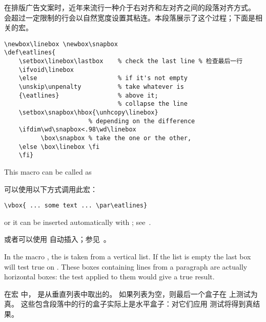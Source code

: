 在排版广告文案时，近年来流行一种介于右对齐和左对齐之间的段落对齐方式。
会超过一定限制的行会以自然宽度设置其粘连。本段落展示了这个过程；下面是相关的宏。

\begin{verbatim}
\newbox\linebox \newbox\snapbox
\def\eatlines{
    \setbox\linebox\lastbox    % check the last line % 检查最后一行
    \ifvoid\linebox
    \else                      % if it's not empty 
    \unskip\unpenalty          % take whatever is 
    {\eatlines}                % above it; 
                               % collapse the line
    \setbox\snapbox\hbox{\unhcopy\linebox} 
                       % depending on the difference
    \ifdim\wd\snapbox<.98\wd\linebox
          \box\snapbox % take the one or the other,
    \else \box\linebox \fi
    \fi}
\end{verbatim}
This macro can be called as

可以使用以下方式调用此宏：
\begin{verbatim}
\vbox{ ... some text ... \par\eatlines}
\end{verbatim}
or it can be inserted automatically
with ; see~\cite{E1}.

或者可以使用  自动插入；参见~\cite{E1}。

In the macro , the  is taken
from a vertical list. If the list is empty
the last box will test true on .
These boxes containing lines from a paragraph
are actually horizontal boxes: the test
 applied to them would give a true
result.

在宏  中， 是从垂直列表中取出的。
如果列表为空，则最后一个盒子在  上测试为真。
这些包含段落中的行的盒子实际上是水平盒子：对它们应用  测试将得到真结果。
 